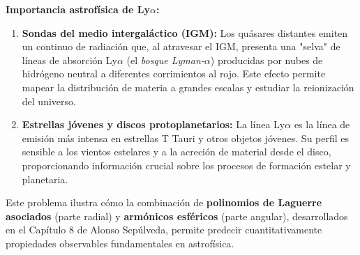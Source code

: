 \documentclass[a4paper]{article}
\begin{document}
\textbf{Importancia astrofísica de Ly$\alpha$:}
\begin{enumerate}
\item \textbf{Sondas del medio intergaláctico (IGM):} Los quásares distantes emiten un continuo de radiación que, al atravesar el IGM, presenta una "selva" de líneas de absorción Ly$\alpha$ (el \textit{bosque Lyman-$\alpha$}) producidas por nubes de hidrógeno neutral a diferentes corrimientos al rojo. Este efecto permite mapear la distribución de materia a grandes escalas y estudiar la reionización del universo.

\item \textbf{Estrellas jóvenes y discos protoplanetarios:} La línea Ly$\alpha$ es la línea de emisión más intensa en estrellas T Tauri y otros objetos jóvenes. Su perfil es sensible a los vientos estelares y a la acreción de material desde el disco, proporcionando información crucial sobre los procesos de formación estelar y planetaria.
\end{enumerate}

Este problema ilustra cómo la combinación de \textbf{polinomios de Laguerre asociados} (parte radial) y \textbf{armónicos esféricos} (parte angular), desarrollados en el Capítulo 8 de Alonso Sepúlveda, permite predecir cuantitativamente propiedades observables fundamentales en astrofísica.
\end{document}
